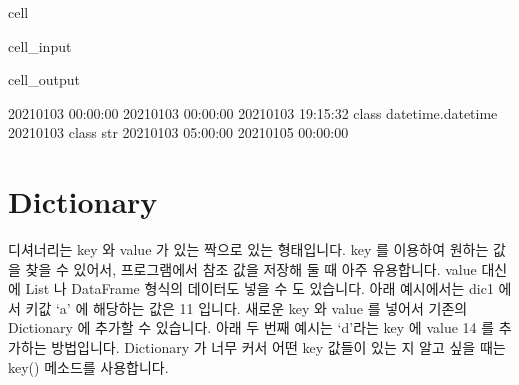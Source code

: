 \documentclass[letterpaper,10pt,english]{jupyterBook}
\begin{document}
\begin{sphinxuseclass}{cell}
\begin{sphinxVerbatimInput}
\begin{sphinxuseclass}{cell_input}
\end{sphinxuseclass}\end{sphinxVerbatimInput}
\begin{sphinxVerbatimOutput}

\begin{sphinxuseclass}{cell_output}
\begin{sphinxVerbatim}[commandchars=\\\{\}]
2021\PYGZhy{}01\PYGZhy{}03 00:00:00
2021\PYGZhy{}01\PYGZhy{}03 00:00:00
2021\PYGZhy{}01\PYGZhy{}03 19:15:32 \PYGZlt{}class \PYGZsq{}datetime.datetime\PYGZsq{}\PYGZgt{}
2021\PYGZhy{}01\PYGZhy{}03 \PYGZlt{}class \PYGZsq{}str\PYGZsq{}\PYGZgt{}
2021\PYGZhy{}01\PYGZhy{}03 05:00:00
2021\PYGZhy{}01\PYGZhy{}05 00:00:00
\end{sphinxVerbatim}

\end{sphinxuseclass}\end{sphinxVerbatimOutput}

\end{sphinxuseclass}

\part{Dictionary}
\label{\detokenize{chapter2/2.1.1_Python_Basics:dictionary}}
\sphinxAtStartPar
디셔너리는 key 와 value 가 있는 짝으로 있는 형태입니다. key 를 이용하여 원하는 값을 찾을 수 있어서, 프로그램에서 참조 값을 저장해 둘 때 아주 유용합니다. value 대신에 List 나 DataFrame 형식의 데이터도 넣을 수 도 있습니다. 아래 예시에서는 dic1 에서 키값 ‘a’ 에 해당하는 값은 11 입니다. 새로운 key 와 value 를 넣어서 기존의 Dictionary 에 추가할 수 있습니다. 아래 두 번째 예시는 ‘d’라는 key 에 value 14 를 추가하는 방법입니다. Dictionary 가 너무 커서 어떤 key 값들이 있는 지 알고 싶을 때는 key() 메소드를 사용합니다.
\end{document}
